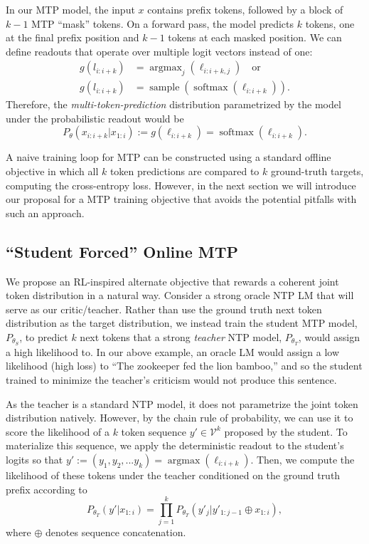 \documentclass{article}
\theoremstyle{plain}
\theoremstyle{definition}
\theoremstyle{remark}
\begin{document}
In our MTP model, the input $x$ contains prefix tokens, followed by a block of $k-1$ MTP ``mask'' tokens.
On a forward pass, the model predicts $k$ tokens, one at the final prefix position and $k-1$ tokens at each masked position. We can define readouts that operate over multiple logit vectors instead of one:
\begin{align*}
g(l_{i:i+k}) &= \operatorname{argmax}_j(\ell_{i:i+k,j}) \quad\text{or} \\
g(l_{i:i+k}) &= \operatorname{sample}(\operatorname{softmax}(\ell_{i:i+k})).
\end{align*}
Therefore, the \textit{multi-token-prediction} distribution parametrized by the model under the probabilistic readout would be
\begin{equation*}
P_\theta(x_{i:i+k} | x_{1:i}) := g(\ell_{i:i+k}) = \operatorname{softmax}(\ell_{i:i+k}).
\end{equation*}

A naive training loop for MTP can be constructed using a standard offline objective in which all $k$ token predictions are compared to $k$ ground-truth targets, computing the cross-entropy loss. However, in the next section we will introduce our proposal for a MTP training objective that avoids the potential pitfalls with such an approach.

\subsection{``Student Forced'' Online MTP}\label{sec:prelim-mtpo2}

We propose an RL-inspired alternate objective that rewards a coherent joint token distribution in a natural way. 
Consider a strong oracle NTP LM that will serve as our critic/teacher.
Rather than use the ground truth next token distribution as the target distribution, we instead train the student MTP model, $P_{\theta_S}$, to predict $k$ next tokens that a strong \textit{teacher} NTP model, $P_{\theta_T}$, would assign a high likelihood to.  In our above example, an oracle LM would assign a low likelihood (high loss) to ``The zookeeper fed the lion bamboo,'' and so the student trained to minimize the teacher's criticism would not produce this sentence.

As the teacher is a standard NTP model, it does not parametrize the joint token distribution natively. However, by the chain rule of probability, we can use it to score the likelihood of a $k$ token sequence $y' \in \mathcal{V}^k$ proposed by the student. To materialize this sequence, we apply the deterministic readout to the student's logits so that $y':= (y_1,y_2,...y_k) = \operatorname{argmax}(\ell_{i:i+k})$. Then, we compute the likelihood of these tokens under the teacher conditioned on the ground truth prefix according to
\begin{equation}\label{eq:teacher-decomp}
P_{\theta_T}(y' | x_{1:i}) = \prod_{j=1}^{k} P_{\theta_T}(y'_{j} | y'_{1:j-1} \oplus x_{1:i}),
\end{equation}
where $\oplus$ denotes sequence concatenation. 
\end{document}
